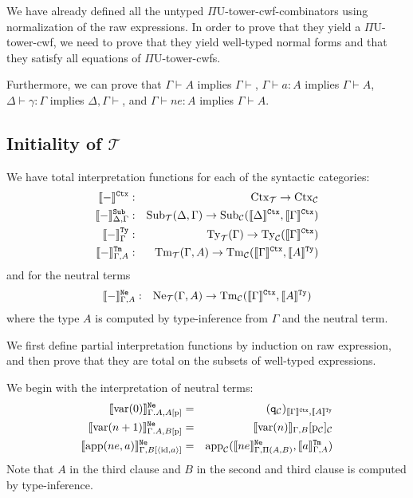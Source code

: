 \documentclass{lmcs}
\def\UU{\mathrm{U}}
\def\RawNe{\texttt{Ne}}
\def\var{\mathrm{var}}
\def\Ctx{\mathrm{Ctx}}
\def\Ty{\mathrm{Ty}}
\def\Tm{\mathrm{Tm}}
\def\Ne{\mathrm{Ne}}
\def\id{\mathrm{id}}
\def\p{\mathrm{p}}
\def\T{\mathcal{T}}
\newcommand{\intCtxU}[1]{\llbracket #1 \rrbracket^\RawCtx}
\newcommand{\intSubU}[1]{\llbracket #1 \rrbracket^\RawSub}
\newcommand{\intTyU}[1]{\llbracket #1 \rrbracket^\RawTy}
\newcommand{\intTmU}[1]{\llbracket #1 \rrbracket^\RawTm}
\newcommand{\intNeU}[1]{\llbracket #1 \rrbracket^\RawNe}
\begin{document}
We have already defined all the untyped $\Pi\UU$-tower-cwf-combinators using normalization of the raw expressions. In order to prove that they yield a $\Pi\UU$-tower-cwf, we need to prove that they yield well-typed normal forms and that they satisfy all equations of  $\Pi\UU$-tower-cwfs. 

Furthermore, we can prove that $\Gamma \vdash A$ implies $\Gamma \vdash$, $\Gamma \vdash a : A$ implies $\Gamma \vdash A$, $\Delta \vdash \gamma : \Gamma$ implies $\Delta, \Gamma \vdash$, and $\Gamma \vdash ne : A$  implies $\Gamma \vdash A$.



\subsection{Initiality of $ \T$}
We have total interpretation functions for each of the syntactic categories:
\begin{eqnarray*}
\intCtxU{-} &:& \Ctx_\T \to \Ctx_\C\\
\intSubU{-}_{\Delta,\Gamma}&:& 
\Sub_\T(\Delta, \Gamma)
\to
\Sub_\C(\intCtxU{\Delta}, \intCtxU{\Gamma})\\
\intTyU{-}_\Gamma&:& \Ty_\T(\Gamma) \to \Ty_\C(\intCtxU{\Gamma})\\
\intTmU{-}_{\Gamma,A} &:& \Tm_\T(\Gamma,A) \to
\Tm_\C (\intCtxU{\Gamma}, \intTyU{A})
\end{eqnarray*}
and for the neutral terms
\begin{eqnarray*}
\intNeU{-}_{\Gamma,A} &:& \Ne_\T(\Gamma,A) \to \Tm_\C (\intCtxU{\Gamma}, \intTyU{A})
\end{eqnarray*}
where the type $A$ is computed by type-inference from $\Gamma$ and the neutral term.

We first define partial interpretation functions by induction on raw expression, and then prove that they are total on the subsets of well-typed expressions. 

We begin with the interpretation of neutral terms:
\begin{eqnarray*}
\intNeU{\var(0)}_{\Gamma.A,A[\p]} &=& (\qI_{\C})_{\intCtxU{\Gamma},\intTyU{A}}\\
\intNeU{\var(n+1)}_{\Gamma.A,B[\p]} &=& \inte{\var(n)}_{\Gamma,B}[\p_\C]_\C\\
\intNeU{\ap(ne,a)}_{\Gamma,B[\langle \id,a \rangle]} &=& \ap_\C(\intNeU{ne}_{\Gamma,\Pi(A,B)},\intTmU{a}_{\Gamma,A})
\end{eqnarray*}
Note that $A$ in the third clause and $B$ in the second and third clause is computed by type-inference.
\end{document}
